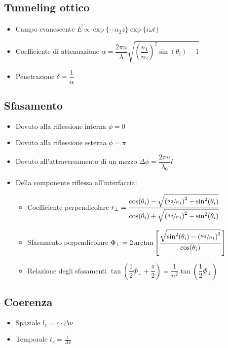 \documentclass{article}
\begin{document}
\subsection{Tunneling ottico}
\begin{itemize}
  \item Campo evanescente \( \vec{E} \propto \exp{\{-\alpha_2 z\}} \exp{\{ i \omega t \}} \)
  \item Coefficiente di attenuazione \( \alpha = \dfrac{2 \pi n}{\lambda} \sqrt{ \left( \dfrac{n_1}{n_2} \right) ^ 2 \sin(\theta_i) - 1} \)
  \item Penetrazione \( \delta = \dfrac{1}{\alpha} \)
\end{itemize}

\newpage

\subsection{Sfasamento}
\begin{itemize}
  \item Dovuto alla riflessione interna \( \phi = 0 \)
  \item Dovuto alla riflessione esterna \( \phi = \pi \)
  \item Dovuto all'attraversamento di un mezzo \( \Delta \phi = \dfrac{2 \pi n}{\lambda_0} l \)
  \item Della componente riflessa all'interfaccia:
        \begin{itemize}
          \item Coefficiente perpendicolare \( r_\perp = \dfrac{\cos(\theta_i) - \sqrt{\left( \sfrac{n_2}{n_1} \right) ^ 2 - \sin^2(\theta_i)}}{\cos(\theta_i) + \sqrt{\left( \sfrac{n_2}{n_1} \right) ^ 2 - \sin^2(\theta_i)}} \)
          \item Sfasamento perpendicolare \( \Phi_\perp = 2 \arctan \left[ \dfrac{ \sqrt{\sin^2(\theta_i) - \left( \sfrac{n_2}{n_1} \right) ^ 2 } }{ \cos(\theta_i) } \right] \)
          \item Relazione degli sfasamenti \( \tan \left( \dfrac{1}{2} \Phi_\perp + \dfrac{\pi}{2} \right) = \dfrac{1}{n ^ 2} \tan \left( \dfrac{1}{2} \Phi_\perp \right) \)
        \end{itemize}
\end{itemize}

\subsection{Coerenza}
\begin{itemize}
  \item Spaziale \( l_c = c \cdot \Delta \nu \)
  \item Temporale \( t_c = \frac{1}{\Delta \nu} \)
\end{itemize}
\end{document}
